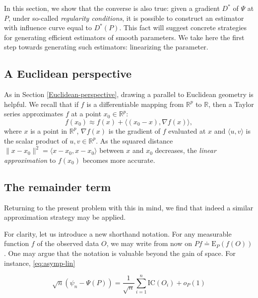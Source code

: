 \documentclass[
  11pt,
  openright,twoside]{book}
\newcommand{\bbR}{\mathbb{R}}
\newcommand{\defq}{\doteq}
\newcommand{\Exp}{\textrm{E}}
\newcommand{\IC}{\textrm{IC}}
\theoremstyle{definition}
\theoremstyle{definition}
\theoremstyle{definition}
\theoremstyle{definition}
\theoremstyle{remark}
\begin{document}
In this section, we show that the converse is also true: given a gradient
\(D^*\) of \(\Psi\) at \(P\), under so-called \emph{regularity conditions}, it is
possible to construct an estimator with influence curve equal to
\(D^*(P)\). This fact will suggest concrete strategies for generating efficient
estimators of smooth parameters. We take here the first step towards
generating such estimators: linearizing the parameter.

\hypertarget{another-Euclidean-perspective}{%
\subsection{A Euclidean perspective}\label{another-Euclidean-perspective}}

As in Section \ref{Euclidean-perspective}, drawing a parallel to Euclidean
geometry is helpful. We recall that if \(f\) is a differentiable mapping from
\(\bbR^p\) to \(\bbR\), then a Taylor series approximates \(f\) at a point \(x_0 \in \bbR^p\): \begin{equation*} f(x_0)  \approx f(x)  + \langle(x_0  - x),  \nabla
f(x)\rangle,\end{equation*} where \(x\) is a point in \(\bbR^p\), \(\nabla f(x)\) is
the gradient of \(f\) evaluated at \(x\) and \(\langle u,v\rangle\) is the scalar
product of \(u,v \in \bbR^{p}\). As the squared distance \(\|x-x_{0}\|^{2} = \langle x-x_{0}, x-x_{0}\rangle\) between \(x\) and \(x_0\) decreases, the \emph{linear
approximation} to \(f(x_0)\) becomes more accurate.

\hypertarget{the-remainder-term}{%
\subsection{The remainder term}\label{the-remainder-term}}

Returning to the present problem with this in mind, we find that indeed a
similar approximation strategy may be applied.

For clarity, let us introduce a new shorthand notation. For any measurable
function \(f\) of the observed data \(O\), we may write from now on \(P f \defq \Exp_P(f(O))\). One may argue that the notation is valuable beyond the gain of
space. For instance, \eqref{eq:asymp-lin}

\begin{equation*}
\sqrt{n}  (\psi_n  - \Psi(P))  =  \frac{1}{\sqrt{n}}  \sum_{i=1}^n \IC(O_i)  +
o_P(1) 
\end{equation*}
\end{document}
